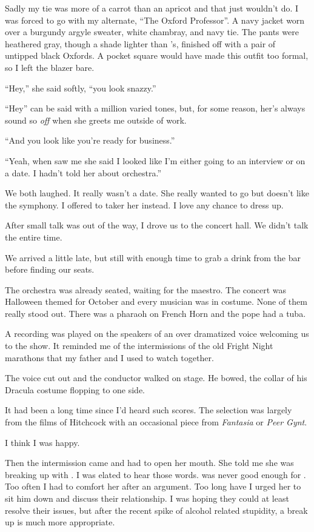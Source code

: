 Sadly my tie was more of a carrot than an apricot and that just wouldn't do.
I was forced to go with my alternate, ``The Oxford Professor''.
A navy jacket worn over a burgundy argyle sweater, white chambray, and
navy tie.
The pants were heathered gray, though a shade lighter than \april's,
finished off with a pair of untipped black Oxfords.
A pocket square would have made this outfit too formal,
so I left the blazer bare.
\VV


``Hey,'' she said softly, ``you look snazzy.''
\VV

\noindent
``Hey'' can be said with a million varied tones, but,
for some reason, her's always sound so \textit{off} when
she greets me outside of work.
\VV


``And you look like you're ready for business.''


``Yeah, when \casey{} saw me she said I looked
like I'm either going to an interview or on a date.
I hadn't told her about orchestra.''
\VV


\noindent
We both laughed.  It really wasn't a date.
She really wanted to go but \eric{} doesn't like
the symphony.  I offered to taker her instead.
I love any chance to dress up.


After small talk was out of the way,
I drove us to the concert hall.
We didn't talk the entire time.
\VV


\noindent
We arrived a little late, but still with enough time to grab a drink
from the bar before finding our seats.


The orchestra was already seated, waiting for the maestro.
The concert was Halloween themed for October and every musician
was in costume.
None of them really stood out.
There was a pharaoh on French Horn and the pope had a tuba.
\VV


\noindent
A recording was played on the speakers of an over dramatized voice
welcoming us to the show.
It reminded me of the intermissions of the old Fright Night marathons
that my father and I used to watch together.


The voice cut out and the conductor walked on stage.
He bowed, the collar of his Dracula costume flopping to one side.


It had been a long time since I'd heard such scores.
The selection was largely from the films of Hitchcock with an
occasional piece from \textit{Fantasia} or \textit{Peer Gynt}.
\VV


\noindent
I think I was happy.
\VV


\noindent
Then the intermission came and \april{} had to open her mouth.
She told me she was breaking up with \eric{}.
I was elated to hear those words.
\eric{} was never good enough for \april{}.
Too often I had to comfort her after an argument.
Too long have I urged her to sit him down and discuss their relationship.
I was hoping they could at least resolve their issues,
but after the recent spike of alcohol related stupidity,
a break up is much more appropriate.


